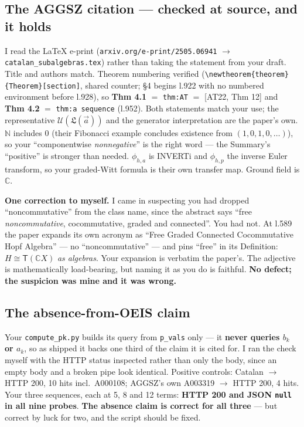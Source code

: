 \documentclass[11pt]{article}
\newcommand{\code}[1]{\texttt{#1}}
\begin{document}
\subsection{The AGGSZ citation --- checked at source, and it holds}
I read the LaTeX e-print (\code{arxiv.org/e-print/2505.06941} $\to$
\code{catalan\_subalgebras.tex}) rather than taking the statement from your draft.
Title and authors match. Theorem numbering verified
(\code{\textbackslash newtheorem\{theorem\}\{Theorem\}[section]}, shared counter;
\S4 begins l.922 with no numbered environment before l.928), so \textbf{Thm 4.1}
$=$ \code{thm:AT} $=$ [AT22, Thm 12] and \textbf{Thm 4.2} $=$
\code{thm:a sequence} (l.952). Both statements match your use; the representative
$\mathcal U(\mathfrak L(\vec a))$ and the generator interpretation are the paper's
own. $\mathbb N$ includes 0 (their Fibonacci example concludes existence from
$(1,0,1,0,\dots)$), so your ``componentwise \emph{nonnegative}'' is the right word
--- the Summary's ``positive'' is stronger than needed. $\phi_{h,a}$ is INVERTi and
$\phi_{h,p}$ the inverse Euler transform, so your graded-Witt formula is their own
transfer map. Ground field is $\mathbb C$.

\textbf{One correction to myself.} I came in suspecting you had dropped
``noncommutative'' from the class name, since the abstract says ``free
\emph{noncommutative}, cocommutative, graded and connected''. You had not. At
l.589 the paper expands its own acronym as ``\textsf{F}ree \textsf{G}raded
\textsf{C}onnected \textsf{C}ocommutative \textsf{H}opf \textsf{A}lgebra'' --- no
``noncommutative'' --- and pins ``free'' in its Definition: $H\cong\mathsf
T(\mathbb C X)$ \emph{as algebras}. Your expansion is verbatim the paper's. The
adjective is mathematically load-bearing, but naming it as you do is faithful.
\textbf{No defect; the suspicion was mine and it was wrong.}

\subsection{The absence-from-OEIS claim}
Your \code{compute\_pk.py} builds its query from \code{p\_vals} only --- it
\textbf{never queries $b_k$ or $a_k$}, so as shipped it backs one third of the
claim it is cited for. I ran the check myself with the HTTP status inspected
rather than only the body, since an empty body and a broken pipe look identical.
Positive controls: Catalan $\to$ HTTP 200, 10 hits incl.\ A000108; AGGSZ's own
A003319 $\to$ HTTP 200, 4 hits. Your three sequences, each at 5, 8 and 12 terms:
\textbf{HTTP 200 and JSON \code{null} in all nine probes}. \textbf{The absence
claim is correct for all three} --- but correct by luck for two, and the script
should be fixed.
\end{document}
